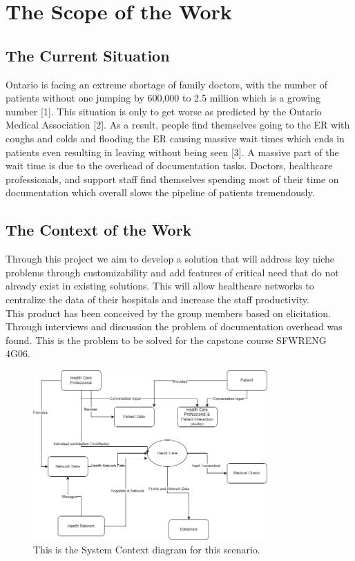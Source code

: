 \documentclass[12pt]{article}
\begin{document}
\section{The Scope of the Work}

\subsection{The Current Situation}
Ontario is facing an extreme shortage of family doctors, with the number of patients without one jumping by 600,000 to 2.5 million which is a growing number [1]. This situation is only to get worse as predicted by the Ontario Medical Association [2]. As a result, people find themselves going to the ER with coughs and colds and flooding the ER causing massive wait times which ends in patients even resulting in leaving without being seen [3]. A massive part of the wait time is due to the overhead of documentation tasks. Doctors, healthcare professionals, and support staff find themselves spending most of their time on documentation which overall slows the pipeline of patients tremendously.

\subsection{The Context of the Work}

Through this project we aim to develop a solution that will address key niche problems through customizability and add features of critical need that do not already exist in existing solutions. This will allow healthcare networks to centralize the data of their hospitals and increase the staff productivity.\\

\noindent This product has been conceived by the group members based on elicitation. Through interviews and discussion the problem of documentation overhead was found. This is the problem to be solved for the capstone course SFWRENG 4G06.

\begin{figure}[H]
  \includegraphics[width=0.8\textwidth]{System_Context.png}
  \caption{This is the System Context diagram for this scenario.}
\end{figure}
\end{document}
